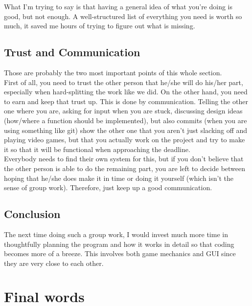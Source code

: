 \documentclass[12pt]{scrartcl}
\begin{document}
	What I'm trying to say is that having a general idea of what you're doing is good, but not enough. A well-structured list of everything you need is worth so much, it saved me hours of trying to figure out what is missing.

	\subsection{Trust and Communication}
	Those are probably the two most important points of this whole section.\\

	First of all, you need to trust the other person that he/she will do his/her part, especially when hard-splitting the work like we did. On the other hand, you need to earn and keep that trust up. This is done by communication. Telling the other one where you are, asking for input when you are stuck, discussing design ideas (how/where a function should be implemented), but also commits (when you are using something like git) show the other one that you aren't just slacking off and playing video games, but that you actually work on the project and try to make it so that it will be functional when approaching the deadline.\\

	Everybody needs to find their own system for this, but if you don't believe that the other person is able to do the remaining part, you are left to decide between hoping that he/she does make it in time or doing it yourself (which isn't the sense of group work). Therefore, just keep up a good communication.

	\subsection{Conclusion}
	The next time doing such a group work, I would invest much more time in thoughtfully planning the program and how it works in detail so that coding becomes more of a breeze. This involves both game mechanics and GUI since they are very close to each other.

	\clearpage


	\section{Final words}\label{sec:final_words}
\end{document}
